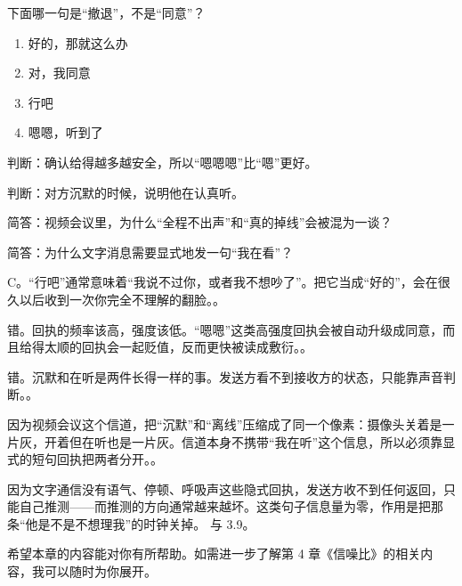 \begin{quizsec}
\item 下面哪一句是“撤退”，不是“同意”？

\begin{enumerate}[label=\Alph*., leftmargin=2.2em, labelsep=0.6em,
                  itemsep=0.2em, topsep=0.3em, parsep=0.1em]
\item 好的，那就这么办
\item 对，我同意
\item 行吧
\item 嗯嗯，听到了
\end{enumerate}

\item 判断：确认给得越多越安全，所以“嗯嗯嗯”比“嗯”更好。

\item 判断：对方沉默的时候，说明他在认真听。

\item 简答：视频会议里，为什么“全程不出声”和“真的掉线”会被混为一谈？

\item 简答：为什么文字消息需要显式地发一句“我在看”？
\end{quizsec}

\begin{answerssec}
\item C。“行吧”通常意味着“我说不过你，或者我不想吵了”。把它当成“好的”，会在很久以后收到一次你完全不理解的翻脸。。

\item 错。回执的频率该高，强度该低。“嗯嗯”这类高强度回执会被自动升级成同意，而且给得太顺的回执会一起贬值，反而更快被读成敷衍。。

\item 错。沉默和在听是两件长得一样的事。发送方看不到接收方的状态，只能靠声音判断。。

\item 因为视频会议这个信道，把“沉默”和“离线”压缩成了同一个像素：摄像头关着是一片灰，开着但在听也是一片灰。信道本身不携带“我在听”这个信息，所以必须靠显式的短句回执把两者分开。。

\item 因为文字通信没有语气、停顿、呼吸声这些隐式回执，发送方收不到任何返回，只能自己推测——而推测的方向通常越来越坏。这类句子信息量为零，作用是把那条“他是不是不想理我”的时钟关掉。 与 3.9。
\end{answerssec}

\hcirule

\begin{qabox}
\end{qabox}

\hcirule

希望本章的内容能对你有所帮助。如需进一步了解第 4 章《信噪比》的相关内容，我可以随时为你展开。

